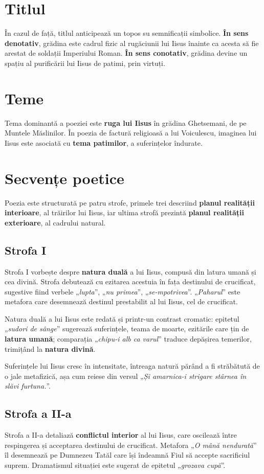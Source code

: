 \documentclass{article}
\newcommand{\qu}[1]{„\emph{#1}”}
\begin{document}
\section{Titlul}
În cazul de față, titlul anticipează un topos su semnificații simbolice. \textbf{În sens denotativ}, grădina este cadrul fizic al rugăciunii lui Iisus înainte ca acesta să fie arestat de soldații Imperiului Roman. \textbf{În sens conotativ}, grădina devine un spațiu al purificării lui Iisus de patimi, prin virtuți. 

\section{Teme}
Tema dominantă a poeziei este \textbf{ruga lui Iisus} în grădina Ghetsemani, de pe Muntele Măslinilor. În poezia de factură religioasă a lui Voiculescu, imaginea lui Iisus este asociată cu \textbf{tema patimilor}, a suferințelor îndurate.

\section{Secvențe poetice}
Poezia este structurată pe patru strofe, primele trei descriind \textbf{planul realității interioare}, al trăirilor lui Iisus, iar ultima strofă prezintă \textbf{planul realității exterioare}, al cadrului natural.

\subsection{Strofa I}
Strofa I vorbește despre \textbf{natura duală} a lui Iisus, compusă din latura umană și cea divină. Strofa debutează cu ezitarea acestuia în fața destinului de crucificat, sugestive fiind verbele \qu{lupta}, \qu{nu primea}, \qu{se-mpotrivea}. \qu{Paharul} este metafora care desemnează destinul prestabilit al lui Iisus, cel de crucificat.

Natura duală a lui Iisus este redată și printr-un contrast cromatic: epitetul \qu{sudori de sânge} sugerează suferințele, teama de moarte, ezitările care țin de \textbf{latura umană}; comparația \qu{chipu-i alb ca varul} traduce depășirea temerilor, trimițând la \textbf{natura divină}.

Suferințele lui Iisus cresc în intensitate, întreaga natură părând a fi străbătută de o jale metafizică, așa cum reiese din versul \qu{Și amarnica-i strigare stârnea în slăvi furtuna.}.

\subsection{Strofa a II-a}
Strofa a II-a detaliază \textbf{conflictul interior} al lui Iisus, care oscilează între respingerea și acceptarea destinului de crucificat. Metafora \qu{O mână nendurată} îl desemnează pe Dumnezeu Tatăl care își îndeamnă Fiul să accepte sacrificiul suprem. Dramatismul situației este sugerat de epitetul \qu{grozava cupă}.
\end{document}
